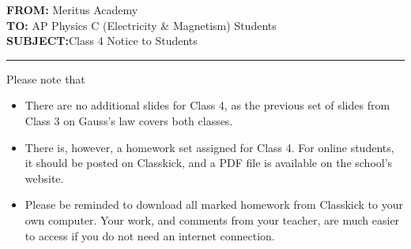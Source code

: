 \documentclass[letterpaper,11pt]{article}
\begin{document}
\textbf{FROM:}\tabto{1.3in} Meritus Academy\\
\textbf{TO:}\tabto{1.3in} AP Physics C (Electricity \& Magnetism) Students\\
\textbf{SUBJECT:}\tabto{1.3in}Class 4 Notice to Students

\vspace{.2in}\hrule

Please note that

\begin{itemize}[itemsep=4pt,topsep=0pt,leftmargin=15pt]
\item There are no additional slides for Class 4, as the previous set of
  slides from Class 3 on Gauss's law covers both classes.

\item There is, however, a homework set assigned for Class 4. For online
  students, it should be posted on Classkick, and a PDF file is available on
  the school's website.

\item Please be reminded to download all marked homework from Classkick to your
  own computer. Your work, and comments from your teacher, are much easier to
  access if you do not need an internet connection.
\end{itemize}
\end{document}
